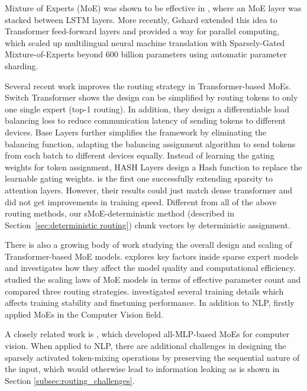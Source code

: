 \documentclass{article}
\begin{document}
Mixture of Experts (MoE) was shown to be effective in \citet{shazeer2017outrageously}, where an MoE layer was stacked between LSTM \citep{hochreiter1997long} layers. More recently, Gshard \citep{gshard} extended this idea to Transformer \citep{vaswani2017attention} feed-forward layers and provided a way for parallel computing, which scaled up multilingual neural machine translation with Sparsely-Gated Mixture-of-Experts beyond 600 billion parameters using automatic parameter sharding.



Several recent work improves the routing strategy in Transformer-based MoEs. Switch Transformer \citep{switch} shows the design can be simplified by routing tokens to only one single expert (top-1 routing). 
In addition, they design a differentiable load balancing loss to reduce communication latency of sending tokens to different devices. Base Layers \citep{baselayer} further simplifies the framework by eliminating the balancing function, adapting the balancing assignment algorithm \citep{bertsekas1992auction} to send tokens from each batch to different devices equally. Instead of learning the gating weights for token assignment, HASH Layers \citep{hashlayer} design a Hash function to replace the learnable gating weights.
\cite{jaszczur2021sparse} is the first one successfully extending sparsity to attention layers. However, their results could just match dense transformer and did not get improvements in training speed.
Different from all of the above routing methods, our sMoE-deterministic method (described in Section~\ref{sec:deterministic routing}) chunk vectors by deterministic assignment. 




There is also a growing body of work studying the overall design and scaling of Transformer-based MoE models. \citet{alibaba} explores key factors inside sparse expert models and investigates how they affect the model quality and computational efficiency. \citet{clark2022unified} studied the scaling laws of MoE models in terms of effective parameter count and compared three routing strategies. \citet{zoph2022designing} investigated several training details which affects training stability and finetuning performance. In addition to NLP, \citet{riquelme2021scaling} firstly applied MoEs in the Computer Vision field.

A closely related work is \citet{lou2021sparse}, which developed all-MLP-based MoEs for computer vision. When applied to NLP, there are additional challenges in designing the sparsely activated token-mixing operations by preserving the sequential nature of the input, which would otherwise lead to information leaking as is shown in Section \ref{subsec:routing_challenges}.
\end{document}

